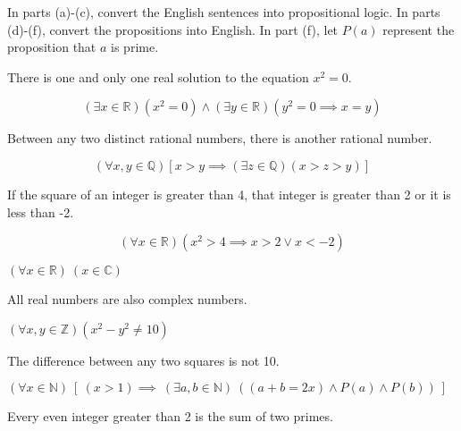 \documentclass[11pt]{article}
\begin{document}
In parts (a)-(c), convert the English sentences into propositional logic. In parts (d)-(f), convert the propositions into English. In part (f), let $P(a)$ represent the proposition that $a$ is prime.
\begin{Parts}

\Part There is one and only one real solution to the equation $x^2 = 0$.

\begin{solution}
\[(\exists x \in \mathbb R) (x^2 = 0) \land (\exists y \in \mathbb R)(y^2 = 0 \implies x = y)\]

\end{solution}
\Part Between any two distinct rational numbers, there is another rational number.

\begin{solution}
  \[ (\forall x, y \in \mathbb Q) [x > y \implies (\exists z \in \mathbb Q)(x > z > y)]\]
\end{solution}
\Part If the square of an integer is greater than 4, that integer is greater than 2 or it is less than -2.
\begin{solution}
\[(\forall x \in \mathbb R) (x^2 > 4 \implies x > 2 \lor x < -2)\]
\end{solution}
\Part $(\forall x \in \mathbb{R})\ (x \in \mathbb{C})$

\begin{solution}
  All real numbers are also complex numbers.
\end{solution}
\Part $(\forall x,y \in \mathbb{Z}) (x^2-y^2 \not=10)$


\begin{solution}
  The difference between any two squares is not 10.
\end{solution}
\Part $(\forall x \in \mathbb{N})\ \left[ \ (x > 1) \implies \ (\exists a, b \in \mathbb{N})  \ \left( (a + b = 2x)\land P(a) \land P(b) \right) \ \right]$

\begin{solution}
Every even integer greater than 2 is the sum of two primes.
\end{solution}
\end{Parts}
\end{document}
